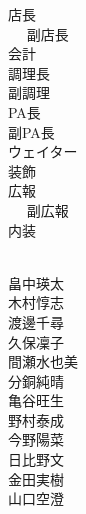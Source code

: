 \documentclass[a4paper]{article}
\begin{document}
\begin{minipage}{\textwidth}
  \centering
  \Huge
  \vspace{3.6em}
  \begin{minipage}[t]{0.4\textwidth}
    \flushright
    店長　\\　
    副店長　\\
    会計　\\
    調理長　\\
    副調理　\\
    PA長　\\
    副PA長　\\
    ウェイター　\\
    装飾　\\
    広報　\\　
    副広報　\\
    内装　\\　
  \end{minipage}
  \begin{minipage}[t]{0.5\textwidth}
    \flushleft
    畠中瑛太\\
    木村惇志\\
    渡邊千尋\\
    久保凜子\\
    間瀬水也美\\
    分銅純晴\\
    亀谷旺生\\
    野村泰成\\
    今野陽菜\\
    日比野文\\
    金田実樹\\
    山口空澄\\
  \end{minipage}
\end{minipage}
\end{document}

